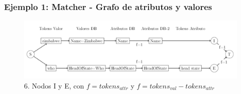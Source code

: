 \begin{frame}
\frametitle{Ejemplo 1: Matcher - Grafo de atributos y valores}
\begin{figure}
  \centering
    \includegraphics[scale=.33]{graficos/presentacion/ejemplo-grafo-matcher-1-6}
    \caption{6. Nodos I y E, con $f=tokens_{attr}$ y $f=tokens_{val} - tokens_{attr}$}
\end{figure}
\end{frame}


